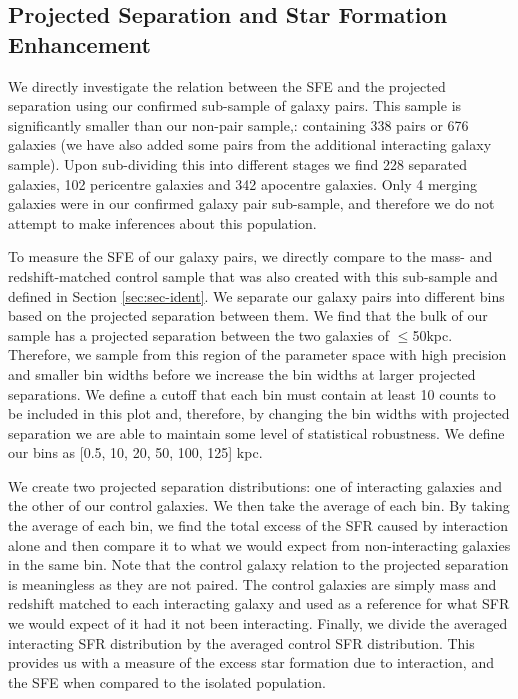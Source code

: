\subsection{Projected Separation and Star Formation Enhancement}
\noindent We directly investigate the relation between the SFE and the projected separation using our confirmed sub-sample of galaxy pairs. This sample is significantly smaller than our non-pair sample,: containing 338 pairs or 676 galaxies (we have also added some pairs from the additional interacting galaxy sample). Upon sub-dividing this into different stages we find 228 separated galaxies, 102 pericentre galaxies and 342 apocentre galaxies. Only 4 merging galaxies were in our confirmed galaxy pair sub-sample, and therefore we do not attempt to make inferences about this population. 

To measure the SFE of our galaxy pairs, we directly compare to the mass- and redshift-matched control sample that was also created with this sub-sample and defined in Section \ref{sec:sec-ident}. We separate our galaxy pairs into different bins based on the projected separation between them. We find that the bulk of our sample has a projected separation between the two galaxies of $\leq$50kpc. Therefore, we sample from this region of the parameter space with high precision and smaller bin widths before we increase the bin widths at larger projected separations. We define a cutoff that each bin must contain at least 10 counts to be included in this plot and, therefore, by changing the bin widths with projected separation we are able to maintain some level of statistical robustness. We define our bins as [0.5, 10, 20, 50, 100, 125] kpc.

We create two projected separation distributions: one of interacting galaxies and the other of our control galaxies. We then take the average of each bin. By taking the average of each bin, we find the total excess of the SFR caused by interaction alone and then compare it to what we would expect from non-interacting galaxies in the same bin. Note that the control galaxy relation to the projected separation is meaningless as they are not paired. The control galaxies are simply mass and redshift matched to each interacting galaxy and used as a reference for what SFR we would expect of it had it not been interacting. Finally, we divide the averaged interacting SFR distribution by the averaged control SFR distribution. This provides us with a measure of the excess star formation due to interaction, and the SFE when compared to the isolated population.


